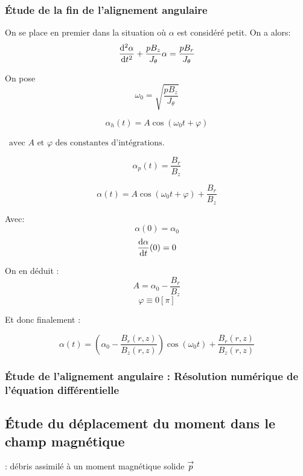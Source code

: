 \documentclass{report}
\begin{document}
\subsubsection{Étude de la fin de l'alignement angulaire}
On se place en premier dans la situation où $\alpha$ est considéré petit. On a alors:
$$\frac{\mathrm{d^2}\alpha}{\mathrm{d}t^2} + \frac{pB_z}{J_\theta}\alpha = \frac{pB_r}{J_\theta} $$

On pose $$\omega_0 = \sqrt{\frac{pB_z}{J_\theta}}$$


$$\alpha_h(t) = A \cos(\omega_0 t + \varphi)$$

$\, \text{ avec } A \text{ et } \varphi \text{ des constantes d'intégrations}$.

\newpage
{}

$$\alpha_p(t) = \frac{B_r}{B_z}$$



$$\alpha(t) = A \cos(\omega_0 t + \varphi) + \frac{B_r}{B_z}$$


Avec:
$$\alpha(0) = \alpha_0$$
$$\frac{\mathrm{d}\alpha}{\mathrm{d}t} (0) = 0$$

On en déduit : 
$$A = \alpha_0  - \frac{B_r}{B_z}$$
$$\varphi \equiv 0 \left[\pi\right] $$ 

Et donc finalement :

\begin{prettybox}[blue]
    $$\alpha(t) = \left(\alpha_0  - \frac{B_r(r,z)}{B_z(r,z)}\right) \cos(\omega_0 t) + \frac{B_r(r,z)}{B_z(r,z)}$$
\end{prettybox}

\subsubsection{Étude de l'alignement angulaire : Résolution numérique de l'équation différentielle}

\subsection{Étude du déplacement du moment dans le champ magnétique}

: {débris assimilé à un moment magnétique solide $\overset{\to}{p}$}
\end{document}
